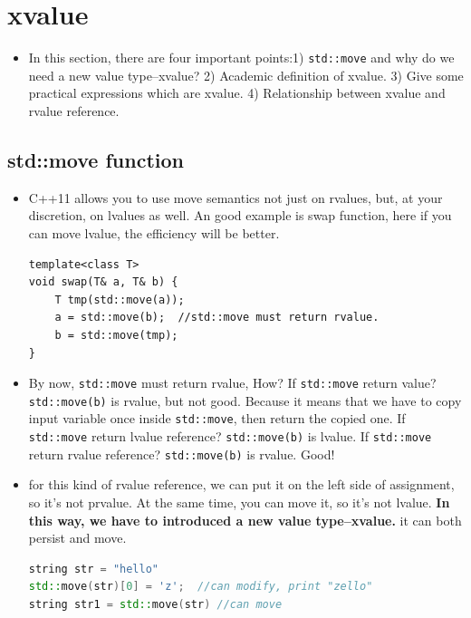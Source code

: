 \documentclass[a4paper,11pt,twoside]{book}
\begin{document}
\section{xvalue}
\begin{itemize}
	\item In this section, there are four important points:1) \texttt{std::move} and why do we need a new value type--xvalue? 2) Academic definition of xvalue. 3) Give some practical expressions which are xvalue. 4) Relationship between xvalue and rvalue reference.
\end{itemize}

\subsection{std::move function}

\begin{itemize}
	\item C++11 allows you to use move semantics not just on rvalues, but, at your discretion, on lvalues as well. An good example is swap function, here if you can move lvalue, the efficiency will be better. 
	
\begin{lstlisting}[numbers=none]
template<class T> 
void swap(T& a, T& b) { 
	T tmp(std::move(a));
	a = std::move(b);  //std::move must return rvalue.
	b = std::move(tmp);
} 
\end{lstlisting}
	
	\item By now, \texttt{std::move} must return rvalue, How? If \texttt{std::move} return value? \texttt{std::move(b)} is rvalue, but not good. Because it means that we have to copy input variable once inside \texttt{std::move}, then return the copied one. If \texttt{std::move} return  lvalue reference? \texttt{std::move(b)} is lvalue. If \texttt{std::move} return  rvalue reference? \texttt{std::move(b)} is rvalue. Good! 

    \item for this kind of rvalue reference, we can put it on the left side of assignment, so it's not prvalue. At the same time, you can move it, so it's not lvalue.  \textbf{In this way, we have to introduced a new value type--xvalue.} it can both persist and move.
    
\begin{lstlisting}[frame=single, language=c++, mathescape=true]
string str = "hello"
std::move(str)[0] = 'z';  //can modify, print "zello"
string str1 = std::move(str) //can move
\end{lstlisting}
	

\end{itemize}
\end{document}
